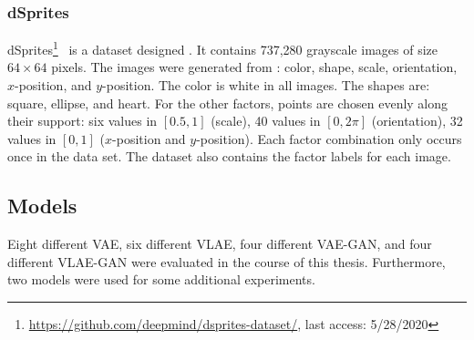 \subsubsection{dSprites}
dSprites\footnote{\href{https://github.com/deepmind/dsprites-dataset/}{https://github.com/deepmind/dsprites-dataset/}, last access: 5/28/2020}~\citep{dsprites17} is a dataset designed .
It contains 737,280 grayscale images of size $64\times 64$ pixels.
The images were generated from : color, shape, scale, orientation, $x$-position, and $y$-position.
The color is white in all images.
The shapes are: square, ellipse, and heart.
For the other factors, points are chosen evenly along their support: six values in $[0.5, 1]$ (scale), 40 values in $[0, 2\pi]$ (orientation), 32 values in $[0, 1]$ ($x$-position and $y$-position).
Each factor combination only occurs once in the data set.
The dataset also contains the factor labels for each image.

\subsection{Models}\label{subsec:models}

Eight different \ac{VAE}, six different \ac{VLAE}, four different \ac{VAE}-\ac{GAN}, and four different \ac{VLAE}-\ac{GAN} were evaluated in the course of this thesis.
Furthermore, two  models were used for some additional experiments.

